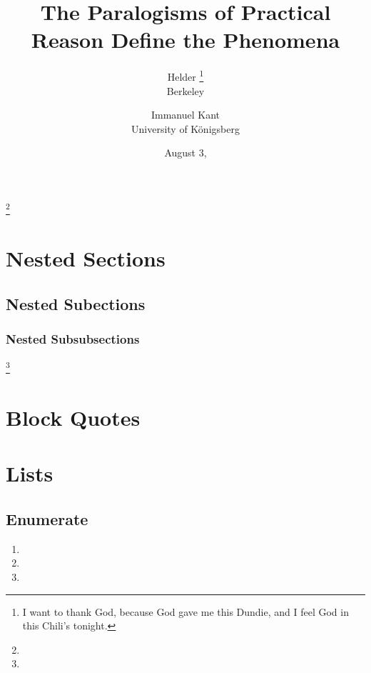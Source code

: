 \documentclass[kant]{rhelder3}
\title{The Paralogisms of Practical Reason Define the Phenomena}
\author{%
  \initials{R.W.} Helder%
  \thanks{%
    I want to thank God,
    because God gave me this Dundie,
    and I feel God in this Chili's tonight.%
  }%
  \\\textacro{UC} Berkeley\and
  Immanuel Kant\\University of Königsberg%
}
\date{August 3, \textdigits{2026}}
\begin{document}
\maketitle

\begin{abstract}
  \autokant
\end{abstract}

\kantsection
\autokant[2]

\kantsubsection
\autokant[2]

\kantsubsubsection
\autokant[2]

\kantparagraph
\autokant

\kantsubparagraph
\autokant*\unskip\footnote{\autokant[1][1]}

\section{Nested Sections}
\unskip\vspace{12pt}
\subsection{Nested Subections}
\subsubsection{Nested Subsubsections}

\autokant*\unskip\footnote{\autokant[0][1]}

\autokant

\section{Block Quotes}

\autokant*
\begin{quote}
  \autokant*[1][2]
\end{quote}
\autokant

\section{Lists}

\subsection{Enumerate}

\autokant*
\begin{enumerate}
  \item \autokant*[1][1]
  \item \autokant*[0][1]
  \item \autokant*[0][1]
\end{enumerate}
\autokant
\end{document}
